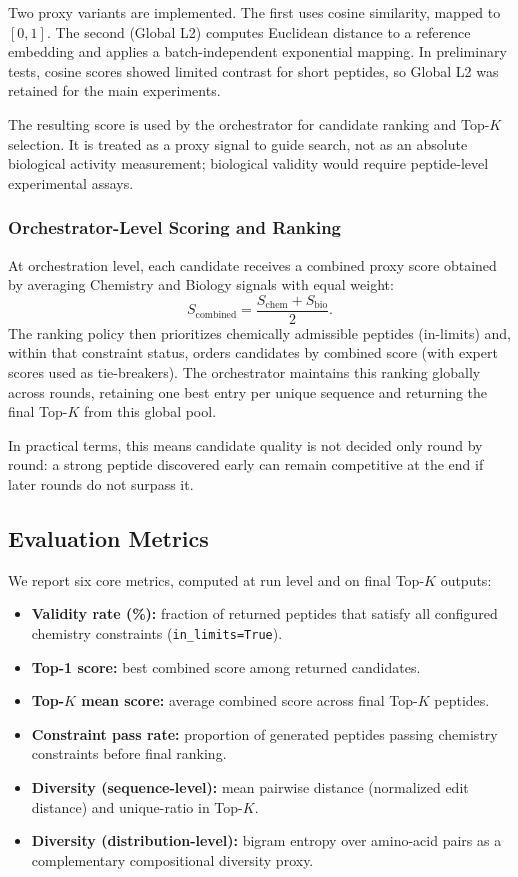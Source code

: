 Two proxy variants are implemented. The first uses cosine similarity, mapped to $[0,1]$. The second (Global L2) computes Euclidean distance to a reference embedding and applies a batch-independent exponential mapping. In preliminary tests, cosine scores showed limited contrast for short peptides, so Global L2 was retained for the main experiments.

The resulting score is used by the orchestrator for candidate ranking and Top-$K$ selection. It is treated as a proxy signal to guide search, not as an absolute biological activity measurement; biological validity would require peptide-level experimental assays.

\subsubsection{Orchestrator-Level Scoring and Ranking}
At orchestration level, each candidate receives a combined proxy score obtained by averaging Chemistry and Biology signals with equal weight:
\begin{equation}
S_{\text{combined}} = \frac{S_{\text{chem}} + S_{\text{bio}}}{2}.
\end{equation}
The ranking policy then prioritizes chemically admissible peptides (in-limits) and, within that constraint status, orders candidates by combined score (with expert scores used as tie-breakers). The orchestrator maintains this ranking globally across rounds, retaining one best entry per unique sequence and returning the final Top-$K$ from this global pool.

In practical terms, this means candidate quality is not decided only round by round: a strong peptide discovered early can remain competitive at the end if later rounds do not surpass it.

\subsection{Evaluation Metrics}\label{subsec:metrics}
We report six core metrics, computed at run level and on final Top-$K$ outputs:
\begin{itemize}
    \item \textbf{Validity rate (\%):} fraction of returned peptides that satisfy all configured chemistry constraints (\texttt{in\_limits=True}).
    \item \textbf{Top-1 score:} best combined score among returned candidates.
    \item \textbf{Top-$K$ mean score:} average combined score across final Top-$K$ peptides.
    \item \textbf{Constraint pass rate:} proportion of generated peptides passing chemistry constraints before final ranking.
    \item \textbf{Diversity (sequence-level):} mean pairwise distance (normalized edit distance) and unique-ratio in Top-$K$.
    \item \textbf{Diversity (distribution-level):} bigram entropy over amino-acid pairs as a complementary compositional diversity proxy.
\end{itemize}

